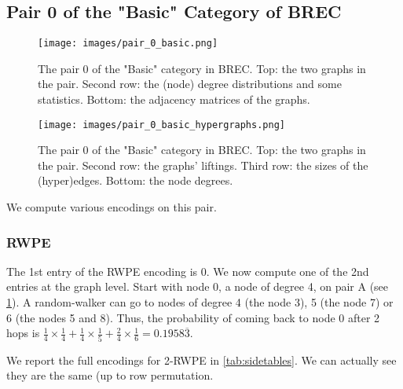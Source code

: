 \subsection{Pair 0 of the "Basic" Category of BREC}\label{appendix-pair-0}

\begin{figure}[H]
  \centering
  \texttt{[image: images/pair\_0\_basic.png]}
  \caption{The pair 0 of the "Basic" category in BREC. Top: the two graphs in the pair. Second row: the (node) degree distributions and some statistics. Bottom: the adjacency matrices of the graphs.}
  \label{fig:pair-0}
\end{figure}

\begin{figure}[H]
  \centering
  \texttt{[image: images/pair\_0\_basic\_hypergraphs.png]}
  \caption{The pair 0 of the "Basic" category in BREC. Top: the two graphs in the pair. Second row: the graphs' liftings. Third row: the sizes of the (hyper)edges. Bottom: the node degrees.}
  \label{fig:pair-0-lifting}
\end{figure}
\pagebreak

We compute various encodings on this pair.

\subsubsection{RWPE} 

The 1st entry of the RWPE encoding is 0. We now compute one of the 2nd entries at the graph level. Start with node 0, a node of degree 4, on pair A (see \ref{fig:pair-0}). A random-walker can go to nodes of degree 4 (the node 3), 5 (the node 7) or 6 (the nodes 5 and 8). Thus, the probability of coming back to node 0 after 2 hops is $\frac{1}{4} \times \frac{1}{4}+\frac{1}{4} \times \frac{1}{5}+\frac{2}{4} \times \frac{1}{6}=0.1958\overline{3}
$.



We report the full encodings for 2-RWPE in \ref{tab:sidetables}. We can actually see they are the same (up to row permutation.

